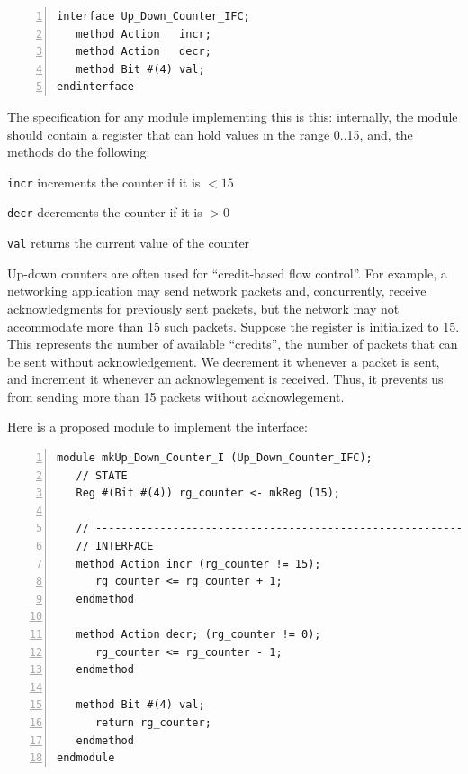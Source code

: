{\small
\begin{Verbatim}[frame=single, numbers=left]
interface Up_Down_Counter_IFC;
   method Action   incr;
   method Action   decr;
   method Bit #(4) val;
endinterface
\end{Verbatim}
}

The specification for any module implementing this is this:
internally, the module should contain a register that can hold values
in the range 0..15, and, the methods do the following:

\begin{tightlist}
 \item \verb|incr|  increments the counter if it is $< 15$
 \item \verb|decr|  decrements the counter if it is $> 0$
 \item \verb|val|   returns the current value of the counter
\end{tightlist}

Up-down counters are often used for ``credit-based flow control''.
For example, a networking application may send network packets and,
concurrently, receive acknowledgments for previously sent packets, but
the network may not accommodate more than 15 such packets.  Suppose
the register is initialized to 15.  This represents the number of
available ``credits'', {\ie} the number of packets that can be sent
without acknowledgement.  We decrement it whenever a packet is sent,
and increment it whenever an acknowlegement is received.  Thus, it
prevents us from sending more than 15 packets without acknowlegement.

Here is a proposed module to implement the interface:

{\small
\begin{Verbatim}[frame=single, numbers=left]
module mkUp_Down_Counter_I (Up_Down_Counter_IFC);
   // STATE
   Reg #(Bit #(4)) rg_counter <- mkReg (15);

   // ----------------------------------------------------------------
   // INTERFACE
   method Action incr (rg_counter != 15);
      rg_counter <= rg_counter + 1;
   endmethod

   method Action decr; (rg_counter != 0);
      rg_counter <= rg_counter - 1;
   endmethod

   method Bit #(4) val;
      return rg_counter;
   endmethod
endmodule
\end{Verbatim}
}


